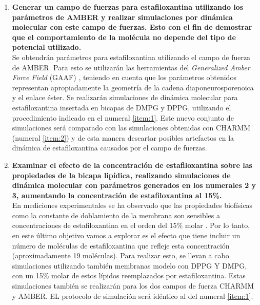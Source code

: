 \begin{enumerate}
\item \textbf{ Generar un campo de fuerzas para estafiloxantina utilizando los parámetros de AMBER y realizar simulaciones por dinámica molecular con este campo de fuerzas. Esto con el fin de demostrar que el comportamiento de la molécula no depende del tipo de potencial utilizado.}\label{item:3}\\
Se obtendrán parámetros para estafiloxantina utilizando el campo de fuerza de AMBER. Para esto se utilizarán las herramientas del \textit{Generalized Amber Force Field} (GAAF) \cite{Amber2016}, teniendo en cuenta que los parámetros obtenidos representan apropiadamente la geometría de la cadena diaponeurosporenoica y el enlace éster. Se realizarán simulaciones de dinámica molecular para estafiloxantina insertada en bicapas de DMPG y DPPG, utilizando el procedimiento indicado en el numeral \ref{item:1}. Este nuevo conjunto de simulaciones será comparado con las simulaciones obtenidas con CHARMM (numeral \ref{item:2}) y de esta manera descartar posibles artefactos en la dinámica de estafiloxantina causados por el campo de fuerzas.\\

\item \textbf{ Examinar el efecto de la concentración de estafiloxantina sobre las propiedades de la bicapa lipídica, realizando simulaciones de dinámica molecular con parámetros generados en los numerales 2 y 3, aumentando  la concentración de estafiloxantina al 15\%.}\label{item:4}\\

En mediciones experimentales se ha observado que las propiedades biofísicas como la constante de doblamiento de la membrana son sensibles a concentraciones de estafiloxantina en el orden del 15\% molar \cite{Perez-LopezVariationsProperties}. Por lo tanto, en este último objetivo vamos a explorar es el efecto que tiene incluir un número de moléculas de estafiloxantina que refleje esta concentración (aproximadamente 19 moléculas). Para realizar esto, se llevan a cabo simulaciones utilizando también membranas modelo con DPPG Y DMPG, con un 15\% molar de estos lípidos reemplazados por estafiloxantina. Estas simulaciones también se realizarán para los dos campos de fuerza CHARMM y AMBER. EL protocolo de simulación será idéntico al del numeral \ref{item:1}.

\end{enumerate}
